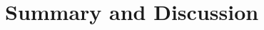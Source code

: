 \documentclass[student, noshadow, lsr, english, aspectratio=169, t]{ITR_LSR_slides}
\begin{document}
\section{Summary and Discussion}




\end{document}
